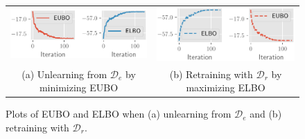 \documentclass{article}
\theoremstyle{definition}
\newcommand{\mcl}[1]{\mathcal{#1}}
\newcommand{\dc}{\mcl{D}_r}
\newcommand{\dr}{\mcl{D}_e}
\begin{document}
%
\begin{figure}
\begin{tabular}{c|c}
     \includegraphics[height=0.17\textwidth]{img/train_eubo.pdf}
     &
     \includegraphics[height=0.17\textwidth]{img/train_elbo.pdf}\\
     (a) Unlearning from $\dr$ by minimizing EUBO
     & 
     (b) Retraining with $\dc$ by maximizing ELBO
\end{tabular}
\caption{Plots of EUBO and ELBO when (a) unlearning from $\dr$ and (b) retraining with $\dc$.}
\label{fig:eubovselbo}
\end{figure}
%
\end{document}
